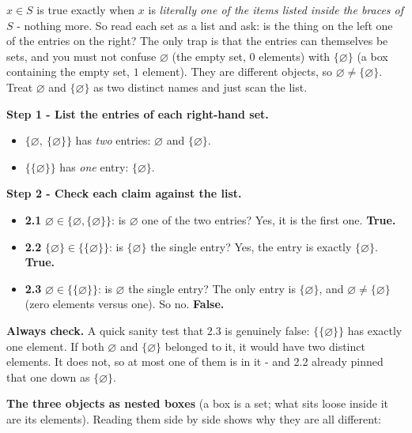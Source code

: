 \documentclass[11pt,a4paper]{article}
\begin{document}
\begin{ideabox}
$x\in S$ is true exactly when $x$ is \emph{literally one of the items listed inside the braces of}
$S$ - nothing more. So read each set as a list and ask: is the thing on the left one of the entries
on the right? The only trap is that the entries can themselves be sets, and you must not confuse
$\varnothing$ (the empty set, $0$ elements) with $\{\varnothing\}$ (a box containing the empty set,
$1$ element). They are different objects, so $\varnothing\neq\{\varnothing\}$. Treat
$\varnothing$ and $\{\varnothing\}$ as two distinct \textquotedbl{}names\textquotedbl{} and just
scan the list.
\end{ideabox}

\textbf{Step 1 - List the entries of each right-hand set.}
\begin{itemize}[leftmargin=1.4cm]
\item $\{\varnothing,\ \{\varnothing\}\}$ has \emph{two} entries: $\varnothing$ and $\{\varnothing\}$.
\item $\{\{\varnothing\}\}$ has \emph{one} entry: $\{\varnothing\}$.
\end{itemize}

\textbf{Step 2 - Check each claim against the list.}
\begin{itemize}[leftmargin=1.4cm]
\item \textbf{2.1} $\varnothing \in \{\varnothing,\{\varnothing\}\}$: is $\varnothing$ one of the
two entries? Yes, it is the first one. \textbf{True.}
\item \textbf{2.2} $\{\varnothing\} \in \{\{\varnothing\}\}$: is $\{\varnothing\}$ the single
entry? Yes, the entry is exactly $\{\varnothing\}$. \textbf{True.}
\item \textbf{2.3} $\varnothing \in \{\{\varnothing\}\}$: is $\varnothing$ the single entry? The
only entry is $\{\varnothing\}$, and $\varnothing\neq\{\varnothing\}$ (zero elements versus one).
So no. \textbf{False.}
\end{itemize}

\textbf{Always check.} A quick sanity test that 2.3 is genuinely false: $\{\{\varnothing\}\}$ has
exactly one element. If both $\varnothing$ and $\{\varnothing\}$ belonged to it, it would have two
distinct elements. It does not, so at most one of them is in it - and 2.2 already pinned that one
down as $\{\varnothing\}$. \checkmark

\textbf{The three objects as nested boxes} (a box is a set; what sits loose inside it are its
elements). Reading them side by side shows why they are all different:
\end{document}
